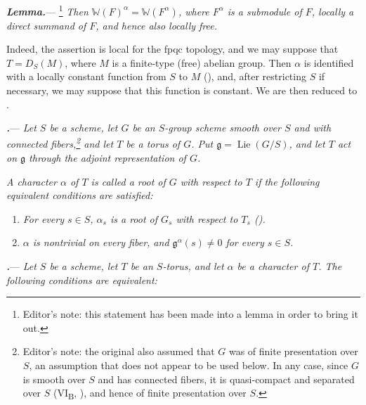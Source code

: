 \par\medskip\noindent
\textbf{\textit{Lemma.}}---%
\footnote{Editor's note: this statement has been made into a lemma in
order to bring it out.}
\textit{Then
\(\mathbb W(F)^\alpha=\mathbb W(F^\alpha)\), where \(F^\alpha\) is a
submodule of \(F\), locally a direct summand of \(F\), and hence also
locally free.}

Indeed, the assertion is local for the fpqc topology, and we may
suppose that \(T=D_S(M)\), where \(M\) is a finite-type (free) abelian
group.  Then \(\alpha\) is identified with a locally constant function
from \(S\) to \(M\) (), and, after restricting \(S\) if
necessary, we may suppose that this function is constant.  We are then
reduced to .

\par\medskip\noindent
{}\textbf{\textit{.}}---
\textit{Let \(S\) be a scheme, let \(G\) be an \(S\)-group scheme
smooth over \(S\) and with connected fibers,\footnote{Editor's note:
the original also assumed that \(G\) was of finite presentation over
\(S\), an assumption that does not appear to be used below.  In any
case, since \(G\) is smooth over \(S\) and has connected fibers, it is
quasi-compact and separated over \(S\) (VI\textsubscript{B}, ), and
hence of finite presentation over \(S\).} and let \(T\) be a torus of
\(G\).  Put \(\mathfrak g=\operatorname{Lie}(G/S)\), and let \(T\)
act on \(\mathfrak g\) through the adjoint representation of \(G\).}

\textit{A character \(\alpha\) of \(T\) is called a \emph{root} of
\(G\) with respect to \(T\) if the following equivalent conditions
are satisfied:}

\begin{enumerate}
\item[\textit{(i)}]
\textit{For every \(s\in S\), \(\alpha_s\) is a root of \(G_s\) with
respect to \(T_s\) ().}

\item[\textit{(ii)}]
\textit{\(\alpha\) is nontrivial on every fiber, and
\(\mathfrak g^\alpha(s)\ne0\) for every \(s\in S\).}
\end{enumerate}

\par\medskip\noindent
\textbf{\textit{.}}---
\textit{Let \(S\) be a scheme, let \(T\) be an \(S\)-torus, and let
\(\alpha\) be a character of \(T\).  The following conditions are
equivalent:}

